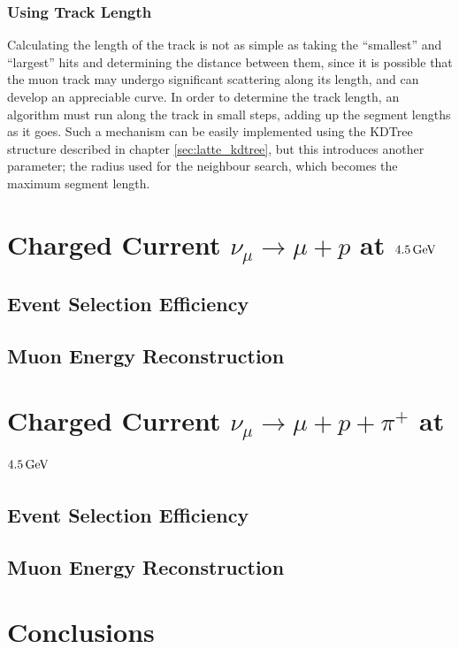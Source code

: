 \subsubsection{Using Track Length}
Calculating the length of the track is not as simple as taking the ``smallest'' and ``largest'' hits and determining the distance between them, since it is possible that the muon track may undergo significant scattering along its length, and can develop an appreciable curve. In order to determine the track length, an algorithm must run along the track in small steps, adding up the segment lengths as it goes. Such a mechanism can be easily implemented using the \ac{KDTree} structure described in chapter \ref{sec:latte_kdtree}, but this introduces another parameter; the radius used for the neighbour search, which becomes the maximum segment length.


\section{Charged Current $\nu_\mu \rightarrow \mu + p$ at $4.5\,\mathrm{GeV}$}
\subsection{Event Selection Efficiency}
\subsection{Muon Energy Reconstruction}

\section{Charged Current $\nu_\mu \rightarrow \mu + p + \pi^+$ at $4.5\,\mathrm{GeV}$}
\subsection{Event Selection Efficiency}
\subsection{Muon Energy Reconstruction}

\section{Conclusions}
